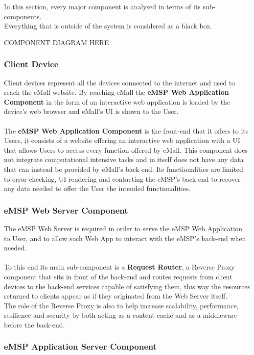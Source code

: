 \documentclass[11pt]{article}
\begin{document}
In this section, every major component is analysed in terms of its sub-components. \\
Everything that is outside of the system is considered as a black box.

COMPONENT DIAGRAM HERE

\subsubsection{Client Device}

Client devices represent all the devices connected to the internet and used to reach the eMall website. By reaching eMall the \textbf{eMSP Web Application Component} in the form of an interactive web application is loaded by the device's web browser and eMall's UI is shown to the User.\\
\\
The \textbf{eMSP Web Application Component} is the front-end that it offers to its Users, it consists of a website offering an interactive web application with a UI that allows Users to access every function offered by eMall. This component does not integrate computational intensive tasks and in itself does not have any data that can instead be provided by eMall's back-end. Its functionalities are limited to error checking, UI rendering and contacting the eMSP's back-end to recover any data needed to offer the User the intended functionalities.

\subsubsection{eMSP Web Server Component}

The eMSP Web Server is required in order to serve the eMSP Web Application to User, and to allow such Web App to interact with the eMSP's back-end when needed. \\
\\
To this end its main sub-component is a \textbf{Request Router}, a Reverse Proxy component that sits in front of the back-end and routes requests from client devices to the back-end services capable of satisfying them, this way the resources returned to clients appear as if they originated from the Web Server itself. \\
The role of the Reverse Proxy is also to help increase scalability, performance, resilience and security by both acting as a content cache and as a middleware before the back-end. 

\subsubsection{eMSP Application Server Component}
\end{document}
